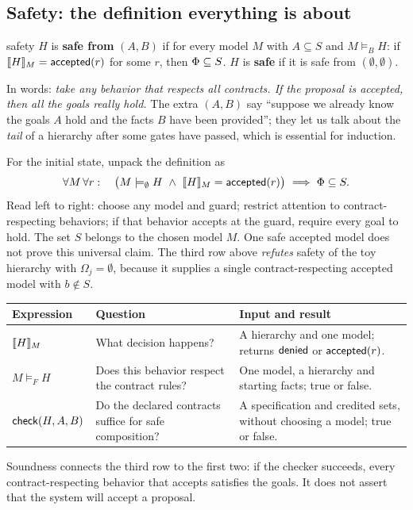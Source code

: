 \subsection{Safety: the definition everything is about}

\begin{defbox}{safety}
$H$ is \textbf{safe from} $(A,B)$ if for every model $M$ with $A\subseteq S$ and $M\models_B H$: if $\llbracket H\rrbracket_{M}=\mathsf{accepted}(r)$ for some $r$, then $\Phi\subseteq S$. $H$ is \textbf{safe} if it is safe from $(\emptyset,\emptyset)$.
\end{defbox}

In words: \emph{take any behavior that respects all contracts. If the proposal is accepted, then all the goals really hold.} The extra $(A,B)$ say ``suppose we already know the goals $A$ hold and the facts $B$ have been provided''; they let us talk about the \emph{tail} of a hierarchy after some gates have passed, which is essential for induction.

For the initial state, unpack the definition as
\[
\forall M\,\forall r:\quad
\bigl(M\models_\emptyset H\ \wedge\ \llbracket H\rrbracket_{M}=\mathsf{accepted}(r)\bigr)
\ \Longrightarrow\ \Phi\subseteq S.
\]
Read left to right: choose any model and guard; restrict attention to contract-respecting behaviors; if that behavior accepts at the guard, require every goal to hold. The set $S$ belongs to the chosen model $M$. One safe accepted model does not prove this universal claim. The third row above \emph{refutes} safety of the toy hierarchy with $\Omega_j=\emptyset$, because it supplies a single contract-respecting accepted model with $b\notin S$.

\begin{center}
\begin{tabularx}{\textwidth}{@{}p{3.4cm}XX@{}}
\toprule
\textbf{Expression} & \textbf{Question} & \textbf{Input and result}\\
\midrule
$\llbracket H\rrbracket_{M}$ & What decision happens? & A hierarchy and one model; returns $\mathsf{denied}$ or $\mathsf{accepted}(r)$.\\
$M\models_F H$ & Does this behavior respect the contract rules? & One model, a hierarchy and starting facts; true or false.\\
$\mathsf{check}(H,A,B)$ & Do the declared contracts suffice for safe composition? & A specification and credited sets, without choosing a model; true or false.\\
\bottomrule
\end{tabularx}
\end{center}
Soundness connects the third row to the first two: if the checker succeeds, every contract-respecting behavior that accepts satisfies the goals. It does not assert that the system will accept a proposal.

